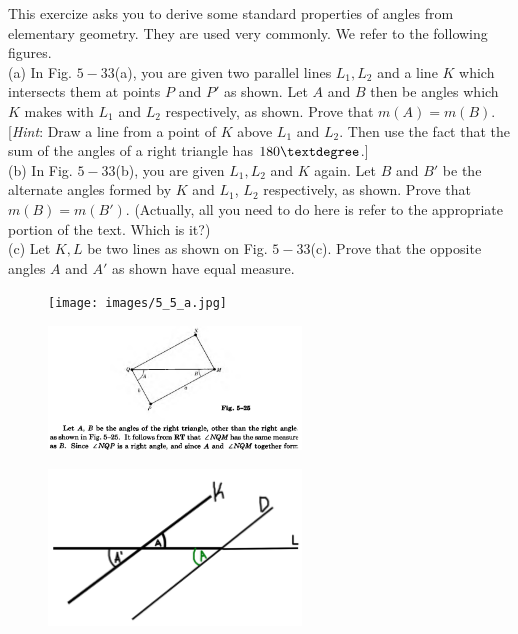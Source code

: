 \newpage
\begin{tcolorbox}[title=Problem 13, breakable]
    This exercize asks you to derive some standard properties of angles from 
    elementary geometry. They are used very commonly. We refer to the following figures. \\

    (a) In Fig. $5-33$(a), you are given two parallel lines $L_1, L_2$ and a line $K$
        which intersects them at points $P$ and $P'$ as shown. Let $A$ and $B$ then 
        be angles which $K$ makes with $L_1$ and $L_2$ respectively, as shown.
        Prove that $m(A) = m(B)$. [\emph{Hint}: Draw a line from a point of $K$ above 
        $L_1$ and $L_2$. Then use the fact that the sum of the angles of a right triangle 
        has $180\textdegree$.] \\

    (b) In Fig. $5-33$(b), you are given $L_1, L_2$ and $K$ again. Let $B$ and $B'$ be 
        the alternate angles formed by $K$ and $L_1$, $L_2$ respectively, as shown.
        Prove that $m(B) = m(B')$. (Actually, all you need to do here is refer 
        to the appropriate portion of the text. Which is it?) \\

    (c) Let $K, L$ be two lines as shown on Fig. $5-33$(c). Prove that the opposite 
        angles $A$ and $A'$ as shown have equal measure.
\end{tcolorbox}

\begin{figure}[h]
    \centering
    \texttt{[image: images/5\_5\_a.jpg]}
\end{figure}

\begin{figure}[h]
    \centering
    \includegraphics[width=0.6\textwidth]{images/5_again.png}
\end{figure}

\begin{figure}[h]
    \centering
    \includegraphics[width=0.6\textwidth]{images/lets_go.png}
\end{figure}

